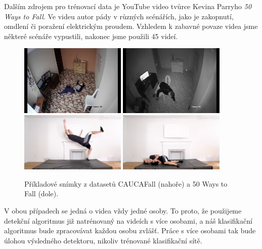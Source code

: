 Dalším zdrojem pro trénovací data je YouTube video tvůrce Kevina Parryho
\textit{50 Ways to Fall}. Ve videu autor pády v různých scénářích, jako je
zakopnutí, omdlení či poražení elektrickým proudem. Vzhledem k zabavné povaze
videa jsme některé scénáře vypustili, nakonec jsme použili 45 videí.

\begin{figure}[]
    \centering
    \includegraphics[width=0.45\textwidth]{Figures/datasets_examples/cauca1.png}
    \includegraphics[width=0.45\textwidth]{Figures/datasets_examples/cauca2.png}
    \includegraphics[width=0.45\textwidth]{Figures/datasets_examples/fifty1.png}
    \includegraphics[width=0.45\textwidth]{Figures/datasets_examples/fifty2.png}
    \caption{Příkladové snímky z datasetů CAUCAFall (nahoře) a 50 Ways to Fall (dole).}
    \label{fig:datasets_examples}
\end{figure}

V obou případech se jedná o videa vždy jedné osoby. To proto, že použijeme
detekční algoritmus již natrénovaný na videích s více osobami, a náš
klasifikační algoritmus bude zpracovávat každou osobu zvlášť. Práce s více
osobami tak bude úlohou výsledného detektoru, nikoliv trénované klasifikační
sítě.

